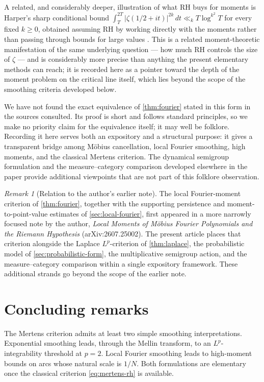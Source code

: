 \documentclass[11pt]{article}
\theoremstyle{remark}
\newtheorem{remark}[theorem]{Remark}
\begin{document}
A related, and considerably deeper, illustration of what RH buys for
moments is Harper's sharp conditional bound
\(\int_T^{2T}|\zeta(1/2+it)|^{2k}\,dt\ll_k T\log^{k^2}T\) for every
fixed \(k\geq0\), obtained assuming RH by working directly with the
moments rather than passing through bounds for large values
\cite{HarperConditionalMoments}.  This is a related moment-theoretic manifestation of the same underlying
question --- how much RH controls the size of \(\zeta\) --- and is
considerably more precise than anything the present elementary methods can
reach; it is recorded here as a pointer toward the depth of the moment
problem on the critical line itself, which lies beyond the scope of the
smoothing criteria developed below.

We have not found the exact equivalence of \cref{thm:fourier} stated in
this form in the sources consulted.  Its proof is short and follows
standard principles, so we make no priority claim for the equivalence
itself; it may well be folklore.  Recording it here serves both an
expository and a structural purpose: it gives a transparent bridge
among M\"obius cancellation, local Fourier smoothing, high moments, and
the classical Mertens criterion.  The dynamical semigroup formulation
and the measure--category comparison developed elsewhere in the paper
provide additional viewpoints that are not part of this folklore
observation.

\begin{remark}[Relation to the author's earlier note]
The local Fourier-moment criterion of \cref{thm:fourier}, together with
the supporting persistence and moment-to-point-value estimates of
\cref{sec:local-fourier}, first appeared in a more narrowly focused
note by the author, \emph{Local Moments of M\"obius Fourier Polynomials
and the Riemann Hypothesis} (arXiv:2607.25002).  The present article
places that criterion alongside the Laplace \(L^p\)-criterion of
\cref{thm:laplace}, the probabilistic model of
\cref{sec:probabilistic-form}, the multiplicative semigroup action, and
the measure--category comparison within a single expository framework.
These additional strands go beyond the scope of the earlier note.
\end{remark}

\section{Concluding remarks}

The Mertens criterion admits at least two simple smoothing
interpretations.  Exponential smoothing leads, through the Mellin
transform, to an \(L^p\)-integrability threshold at \(p=2\).  Local
Fourier smoothing leads to high-moment bounds on arcs whose natural
scale is \(1/N\).  Both formulations are elementary once the classical
criterion \eqref{eq:mertens-rh} is available.
\end{document}
